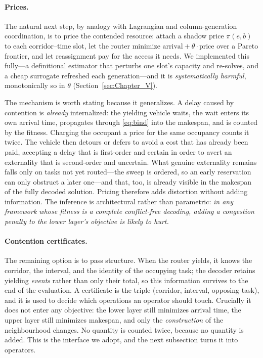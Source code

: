 \documentclass[manuscript,screen,review]{acmart}
\begin{document}
\paragraph{Prices.}
The natural next step, by analogy with Lagrangian and column-generation
coordination, is to price the contended resource: attach a shadow price
$\pi(e,b)$ to each corridor--time slot, let the router minimize
$\text{arrival}+\theta\cdot\text{price}$ over a Pareto frontier, and let
reassignment pay for the access it needs. We implemented this fully---a
definitional estimator that perturbs one slot's capacity and re-solves, and a
cheap surrogate refreshed each generation---and it is
\emph{systematically harmful}, monotonically so in $\theta$
(Section~\ref{sec:Chapter_V}).

The mechanism is worth stating because it generalizes. A delay caused by
contention is \emph{already} internalized: the yielding vehicle waits, the wait
enters its own arrival time, propagates through \eqref{eq:bind} into the
makespan, and is counted by the fitness. Charging the occupant a price for the
same occupancy counts it twice. The vehicle then detours or defers to avoid a
cost that has already been paid, accepting a delay that is first-order and
certain in order to avert an externality that is second-order and uncertain.
What genuine externality remains falls only on tasks not yet routed---the sweep
is ordered, so an early reservation can only obstruct a later one---and that,
too, is already visible in the makespan of the fully decoded solution. Pricing
therefore adds distortion without adding information. The inference is
architectural rather than parametric: \emph{in any framework whose fitness is a
complete conflict-free decoding, adding a congestion penalty to the lower
layer's objective is likely to hurt.}

\paragraph{Contention certificates.}
The remaining option is to pass structure. When the router yields, it knows the
corridor, the interval, and the identity of the occupying task; the decoder
retains yielding \emph{events} rather than only their total, so this
information survives to the end of the evaluation. A certificate is the triple
(corridor, interval, opposing task), and it is used to decide which operations
an operator should touch. Crucially it does not enter any objective: the lower
layer still minimizes arrival time, the upper layer still minimizes makespan,
and only the \emph{construction} of the neighbourhood changes. No quantity is
counted twice, because no quantity is added. This is the interface we adopt,
and the next subsection turns it into operators.
\end{document}
